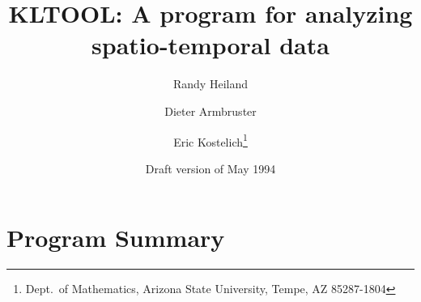 \hoffset -0.15in
\voffset -0.5in
\setlength{\parskip}{0pt}
\setlength{\parindent}{.5in}
\setlength{\textwidth}{6.0in}
\setlength{\textheight}{8.5in}

\title{KLTOOL:  A program for analyzing spatio-temporal data}
\author{Randy Heiland \and Dieter Armbruster \and Eric Kostelich\thanks{
	Dept.\ of Mathematics, Arizona State University, Tempe, AZ  85287-1804}}
\date{Draft version of May 1994}
\maketitle
\section{Program Summary}
